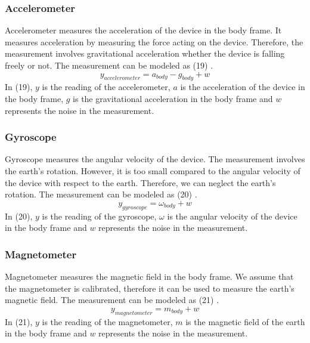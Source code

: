 \documentclass[12pt]{article}
\begin{document}
    \subsubsection{Accelerometer}
    Accelerometer measures the acceleration of the device in the body frame. 
    It measures acceleration by measuring the force acting on the device. 
    Therefore, the measurement involves gravitational acceleration whether 
    the device is falling freely or not. The measurement can be modeled as (19) \cite{kok}.
    \begin{equation}\label{eq:19}
        y_{accelerometer} = a_{body} - g_{body} + w
    \end{equation}
    In (19), \(y\) is the reading of the accelerometer, \(a\) is the acceleration of the device 
    in the body frame, \(g\) is the gravitational acceleration in the body frame 
    and \(w\) represents the noise in the measurement.

    \subsubsection{Gyroscope}
    Gyroscope measures the angular velocity of the device. The measurement involves 
    the earth's rotation. However, it is too small compared to the angular velocity 
    of the device with respect to the earth. Therefore, we can neglect the earth's 
    rotation. The measurement can be modeled as (20) \cite{kok}.
    \begin{equation}\label{eq:20}
        y_{gyroscope} = \omega_{body} + w
    \end{equation}
    In (20), \(y\) is the reading of the gyroscope, \(\omega\) is the angular velocity of the 
    device in the body frame and \(w\) represents the noise in the measurement.

    \subsubsection{Magnetometer}
    Magnetometer measures the magnetic field in the body frame. We assume that the 
    magnetometer is calibrated, therefore it can be used to measure the earth's 
    magnetic field. The measurement can be modeled as (21) \cite{kok}.
    \begin{equation}\label{eq:21}
        y_{magnetometer} = m_{body} + w
    \end{equation}
    In (21), \(y\) is the reading of the magnetometer, \(m\) is the magnetic field of the 
    earth in the body frame and \(w\) represents the noise in the measurement.
      
\end{document}

